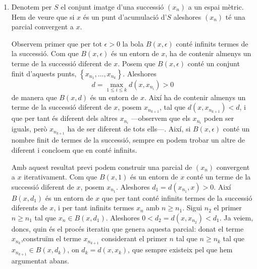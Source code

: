 \documentclass[12pt]{article}
\numberwithin{table}{section}
\numberwithin{figure}{section}
\numberwithin{equation}{section}
\newcommand{\set}[1]{\left\{ #1\right\}}
\begin{document}
\begin{enumerate}[label=(\alph*), font=\bfseries \sffamily, wide, labelwidth=!, labelindent=0pt]
	\item Denotem per \( S \) el conjunt imatge d'una successió \( (x_n) \) a un espai mètric. Hem de veure que si \( x \) és un punt d'acumulació d'\( S \) aleshores \( (x_n) \) té una parcial convergent a \( x \).

		Observem primer que per tot \( \epsilon > 0 \) la bola \( B(x, \epsilon) \) conté infinits termes de la successió. Com que \( B(x, \epsilon) \) és un entorn de \( x \), ha de contenir almenys un terme de la successió diferent de \( x \). Posem que \( B(x, \epsilon) \)	conté un conjunt finit d'aquests punts, \( \set{x_{n_1}, \dots, x_{n_k}} \). Aleshores
		\begin{equation*}
			d = \max_{1 \leq i \leq k} d(x, x_{n_i}) > 0
		\end{equation*}
		de manera que \( B(x, d) \) és un entorn de \( x \). Així ha de contenir almenys un terme de la successió diferent de \( x \), posem \( x_{n_{k+1}} \), tal que \( d(x,x_{n_{k+1}}) < d \), i que per tant és diferent dels altres \( x_{n_i} \) ---observem que els \( x_{n_i} \) poden ser iguals, però \( x_{n_{k+1}} \) ha de ser diferent de tots ells---. Així, si \( B(x, \epsilon) \) conté un nombre finit de termes de la successió, sempre en podem trobar un altre de diferent i concloem que en conté infinits.

		Amb aquest resultat previ podem construir una parcial de \( (x_n) \) convergent a \( x \) iterativament. Com que \( B(x,1) \) és un entorn de \( x \) conté un terme de la successió diferent de \( x \), posem \( x_{n_1} \). Aleshores \( d_1 =  d(x_{n_1}, x) > 0 \). Així \( B(x, d_1) \) és un entorn de \( x \) que per tant conté infinits termes de la successió diferents de \( x \), i per tant infinits termes \( x_n \) amb \( n \geq n_1 \). Sigui \( n_2 \) el primer \( n \geq n_1 \) tal que \( x_n \in B(x,d_1) \). Aleshores \( 0 < d_2 = d(x,x_{n_2}) < d_1 \). Ja veiem, doncs, quin és el procés iteratiu que genera aquesta parcial: donat el terme \( x_{n_k} \),construïm el terme \( x_{n_{k+1}} \) considerant el primer \( n \) tal que \( n \geq n_k \) tal que \( x_{n_{k+1}} \in B(x, d_k) \), on \( d_k = d(x, x_k) \), que sempre existeix pel que hem argumentat abans. 


\end{enumerate}
\end{document}
